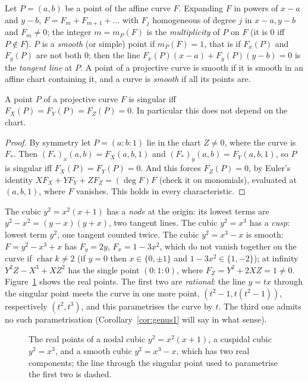 Let $P=(a,b)$ be a point of the affine curve $F$. Expanding $F$ in powers of $x-a$ and $y-b$, $F=F_m+F_{m+1}+\dots$ with $F_j$ homogeneous of
degree $j$ in $x-a,y-b$ and $F_m\ne0$; the integer $m=m_P(F)$ is the \emph{multiplicity} of $P$ on $F$ (it is $0$ iff $P\notin F$). $P$ is a
\emph{smooth} (or simple) point if $m_P(F)=1$, that is if $F_x(P)$ and $F_y(P)$ are not both $0$; then the line $F_x(P)(x-a)+F_y(P)(y-b)=0$ is
the \emph{tangent line} at $P$. A point of a projective curve is smooth if it is smooth in an affine chart containing it, and a curve is
\emph{smooth} if all its points are.

\begin{lemma}\label{lem:projsmooth}
A point $P$ of a projective curve $F$ is singular iff $F_X(P)=F_Y(P)=F_Z(P)=0$. In particular this does not depend on the chart.
\end{lemma}
\begin{proof}
By symmetry let $P=(a:b:1)$ lie in the chart $Z\ne0$, where the curve is $F_*$. Then $(F_*)_x(a,b)=F_X(a,b,1)$ and $(F_*)_y(a,b)=F_Y(a,b,1)$, so
$P$ is singular iff $F_X(P)=F_Y(P)=0$. And this forces $F_Z(P)=0$, by Euler's identity $XF_X+YF_Y+ZF_Z=(\deg F)F$ (check it on monomials),
evaluated at $(a,b,1)$, where $F$ vanishes. This holds in every characteristic.
\end{proof}

\begin{example}\label{exa:threecubics}
The cubic $y^2=x^2(x+1)$ has a \emph{node} at the origin: its lowest terms are $y^2-x^2=(y-x)(y+x)$, two tangent lines. The cubic $y^2=x^3$ has a
\emph{cusp}: lowest term $y^2$, one tangent counted twice. The cubic $y^2=x^3-x$ is smooth: $F=y^2-x^3+x$ has $F_y=2y$, $F_x=1-3x^2$, which do not
vanish together on the curve if $\operatorname{char}k\ne2$ (if $y=0$ then $x\in\{0,\pm1\}$ and $1-3x^2\in\{1,-2\}$); at infinity
$Y^2Z-X^3+XZ^2$ has the single point $(0:1:0)$, where $F_Z=Y^2+2XZ=1\ne0$. Figure~\ref{fig:threecubics} shows the real points. The first two are
\emph{rational}: the line $y=tx$ through the singular point meets the curve in one more point, $(t^2-1,t(t^2-1))$, respectively $(t^2,t^3)$, and
this parametrises the curve by $t$. The third one admits no such parametrisation (Corollary~\ref{cor:genus1} will say in what sense).
\end{example}

\begin{figure}[ht]
\centering{}
\caption{The real points of a nodal cubic $y^2=x^2(x+1)$, a cuspidal cubic $y^2=x^3$, and a smooth cubic $y^2=x^3-x$, which has two real
components; the line through the singular point used to parametrise the first two is dashed.}
\label{fig:threecubics}
\end{figure}

